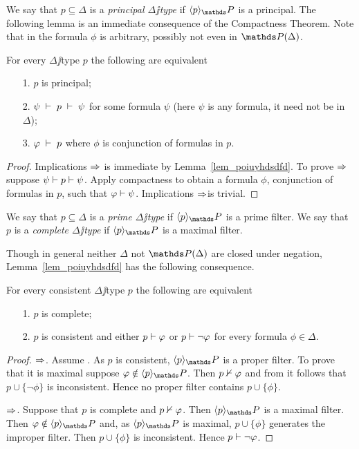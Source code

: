 \documentclass[creche.tex]{subfiles}
\begin{document}
We say that $p\subseteq\Delta$ is a \emph{principal $\Delta\jj$type\/} if $\<p\>_\PP$ is a principal. The following lemma is an immediate consequence of the Compactness Theorem. Note that in  the formula $\phi$ is arbitrary, possibly not even in $\PP(\Delta)$.

\begin{lemma}
For every $\Delta\jj$type $p$ the following are equivalent
\begin{itemize}
\item[1.] $p$ is principal;
\item[2.] $\psi \;\vdash\; p \;\vdash\; \psi$ for some formula $\psi$ (here $\psi$ is any formula, it need not be in $\Delta$);
\item[3.] $\varphi \;\vdash\; p$ where $\phi$ is conjunction of formulas in $p$.\QED
\end{itemize}
\end{lemma}

\begin{proof}
Implications $\Rightarrow$ is immediate by Lemma~\ref{lem_poiuyhdsdfd}. To prove $\Rightarrow$ suppose $\psi\vdash p\vdash\psi$. Apply compactness to obtain a formula $\phi$, conjunction of formulas in $p$, such that $\varphi\vdash\psi$. Implications $\Rightarrow$is trivial.
\end{proof}

\begin{definition}
We say that $p\subseteq\Delta$ is a \emph{prime $\Delta\jj$type\/} if $\<p\>_\PP$ is a  prime filter. We say that $p$ is a \emph{complete $\Delta\jj$type\/} if $\<p\>_\PP$ is a maximal filter.\QED
\end{definition}

Though in general neither $\Delta$ not $\PP(\Delta)$ are closed under negation, Lemma~\ref{lem_poiuyhdsdfd} has the following consequence.

\begin{proposition}\label{prop_test_completezza}
For every consistent $\Delta\jj$type $p$ the following are equivalent
\begin{itemize}
\item[1.] $p$ is complete;
\item[2.] $p$ is consistent and either $p\vdash\varphi$ or $p\vdash\neg\varphi$ for every formula $\phi\in\Delta$.
\end{itemize}
\end{proposition}
\begin{proof}
$\Rightarrow$. Assume . As $p$ is consistent, $\<p\>_\PP$ is a proper filter. To prove that it is maximal suppose $\phi\notin\<p\>_\PP$. Then $p\nvdash\varphi$ and from  it follows that  $p\cup\{\neg\phi\}$ is inconsistent. Hence no proper filter contains $p\cup\{\phi\}$.

$\Rightarrow$. Suppose that $p$ is complete and $p\nvdash\varphi$. Then $\<p\>_\PP$ is a maximal filter. Then $\phi\notin\<p\>_\PP$ and, as $\<p\>_\PP$ is maximal, $p\cup\{\phi\}$ generates the improper filter. Then $p\cup\{\phi\}$ is inconsistent. Hence $p\vdash\neg\varphi$.
\end{proof}
\end{document}
